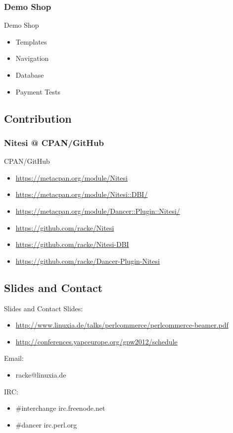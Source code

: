 \subsubsection{Demo Shop}
\begin{frame}{Demo Shop} 
  \begin{itemize}
  \item Templates
  \item Navigation
  \item Database
  \item Payment Tests
  \end{itemize}
\end{frame}

\subsection{Contribution}
\subsubsection{Nitesi @ CPAN/GitHub}
\begin{frame}{CPAN/GitHub}
\begin{itemize}
\item \url{https://metacpan.org/module/Nitesi}
\item \url{https://metacpan.org/module/Nitesi::DBI/}
\item \url{https://metacpan.org/module/Dancer::Plugin::Nitesi/}
\end{itemize}
\begin{itemize}
\item \url{https://github.com/racke/Nitesi}
\item \url{https://github.com/racke/Nitesi-DBI}
\item \url{https://github.com/racke/Dancer-Plugin-Nitesi}
\end{itemize}
\end{frame}

\subsection{Slides and Contact}
\begin{frame}{Slides and Contact}
Slides:
\begin{itemize}
\item \url{http://www.linuxia.de/talks/perlcommerce/perlcommerce-beamer.pdf}
\item \url{http://conferences.yapceurope.org/gpw2012/schedule}
\end{itemize}

Email:
\begin{itemize}
\item racke@linuxia.de
\end{itemize}

IRC:
\begin{itemize}
\item \#interchange irc.freenode.net
\item \#dancer irc.perl.org
\end{itemize}

\end{frame}

